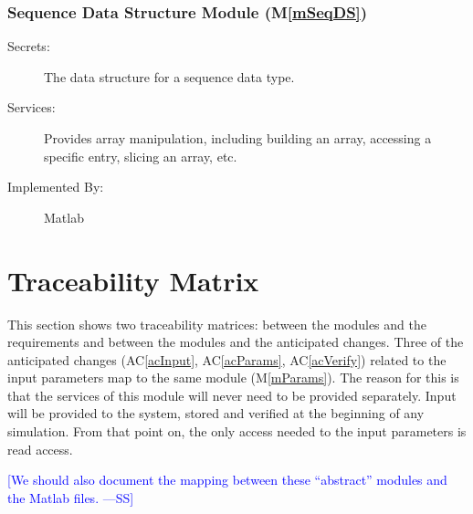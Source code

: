 \documentclass[12pt]{article}
\newcommand{\authornote}[3]{\textcolor{#1}{[#3 ---#2]}}
\newcommand{\authornote}[3]{}
\newcommand{\wss}[1]{\authornote{blue}{SS}{#1}}
\newcommand{\acref}[1]{AC\ref{#1}}
\newcommand{\mref}[1]{M\ref{#1}}
\begin{document}
\subsubsection{Sequence Data Structure Module (\mref{mSeqDS})}

\begin{description}
\item[Secrets:] The data structure for a sequence data type.
\item[Services:] Provides array manipulation, including building an array,
  accessing a specific entry, slicing an array, etc.
\item[Implemented By:] Matlab
\end{description}

%

\section{Traceability Matrix} \label{SecTM}

This section shows two traceability matrices: between the modules and the
requirements and between the modules and the anticipated changes. Three of the 
anticipated changes (\acref{acInput}, \acref{acParams}, \acref{acVerify})
related to the input parameters map to the same module (\mref{mParams}).  The
reason for this is that the services of this module will never need to be
provided separately.  Input will be provided to the system, stored and verified
at the beginning of any simulation.  From that point on, the only access needed
to the input parameters is read access.

\wss{We should also document the mapping between these ``abstract'' modules and
  the Matlab files.}
\end{document}
